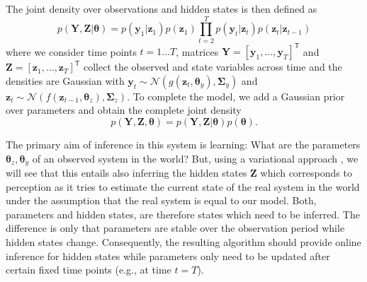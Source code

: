 \documentclass[a4paper,10pt]{article}
\newcommand{\bs}[1]{\mathbf{#1}}					%
\newcommand{\bgs}[1]{\boldsymbol{#1}}				%
\newcommand{\tr}{\mathsf{T}}				%
\newcommand{\eq}[1]{\begin{equation} #1 \end{equation}}%
\renewcommand{\ss}{z}         %
\newcommand{\so}{y}         %
\renewcommand{\sp}{\theta}    %
\newcommand{\ps}{\bs{\ss}}    %
\newcommand{\po}{\bs{\so}}    %
\newcommand{\pp}{\bgs{\sp}} %
\newcommand{\Ps}{\bs{Z}}    %
\newcommand{\Po}{\bs{Y}}    %
\newcommand{\N}{\mathcal{N}}			%
\newcommand{\Cov}{\bgs{\Sigma}}			%
\begin{document}
The joint density over observations and hidden states is then defined as
\eq{
    p(\Po,\Ps|\pp) = p(\po_1|\ps_1)p(\ps_1)\prod_{t=2}^T p(\po_t|\ps_t)p(\ps_t|\ps_{t-1})
}
where we consider time points $t=1\dots T$, matrices $\Po = [\po_1, \dots, \po_T]^\tr$ and $\Ps = [\ps_1, \dots, \ps_T]^\tr$ collect the observed and state variables across time and the densities are Gaussian with $\po_t \sim \N(g(\ps_t, \pp_{\so}), \Cov_{\so})$ and $\ps_t \sim \N(f(\ps_{t-1}, \pp_{\ss}), \Cov_{\ss})$. To complete the model, we add a Gaussian prior over parameters and obtain the complete joint density
\eq{
    p(\Po,\Ps,\pp) = p(\Po,\Ps|\pp)p(\pp).
}

The primary aim of inference in this system is learning: What are the parameters $\pp_{\ss}, \pp_{\so}$ of an observed system in the world? But, using a variational approach \cite{Beal2003}, we will see that this entails also inferring the hidden states $\Ps$ which corresponds to perception as it tries to estimate the current state of the real system in the world under the assumption that the real system is equal to our model. Both, parameters and hidden states, are therefore states which need to be inferred. The difference is only that parameters are stable over the observation period while hidden states change. Consequently, the resulting algorithm should provide online inference for hidden states while parameters only need to be updated after certain fixed time points (e.g., at time $t=T$).
\end{document}
